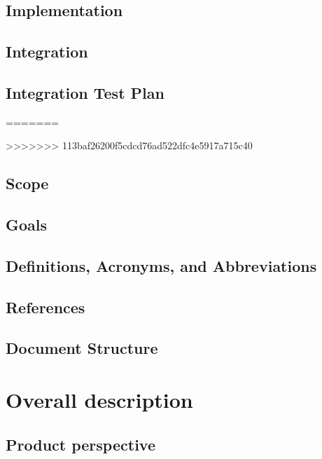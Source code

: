 \documentclass[12pt, a4paper]{report}
\begin{document}
\section{Implementation}


\section{Integration}


\section{Integration Test Plan}


=======

>>>>>>> 113baf26200f5cdcd76ad522dfc4e5917a715c40

\section{Scope}


\section{Goals}


\section{Definitions, Acronyms, and Abbreviations}


\section{References}


\section{Document Structure}


\chapter{Overall description}
\label{ch:overall-desc}

\section{Product perspective}

\end{document}
